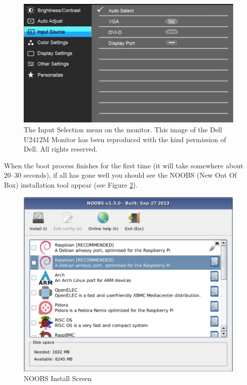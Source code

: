 \begin{figure}
\centerline{\includegraphics[width=12cm]{images/DellInputMenu.jpg}}
\caption{The Input Selection menu on the monitor. This image  of the Dell U2412M Monitor has been reproduced with the kind permission of Dell. All rights reserved.}\label{figure:monitorswitch}
\end{figure}

When the boot process finishes for the first time (it will take somewhere
about 20--30 seconds), if all has gone well you should see the NOOBS (New Out Of Box)
installation tool appear (see Figure \ref{figure:noobs-install-screen}).

\begin{figure}
\centerline{\includegraphics[width=13cm]{images/noobs-install-screen}}
\caption{NOOBS Install Screen}\label{figure:noobs-install-screen}
\end{figure}

